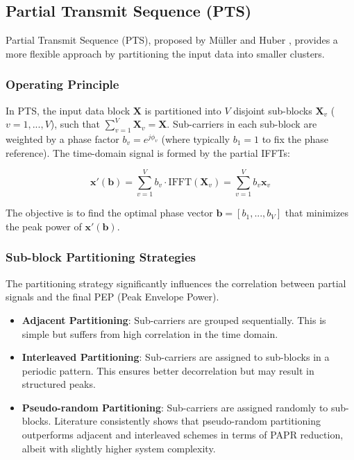 \documentclass[conference]{IEEEtran}
\begin{document}
\subsection{Partial Transmit Sequence (PTS)}
Partial Transmit Sequence (PTS), proposed by Müller and Huber \cite{ref6}, provides a more flexible approach by partitioning the input data into smaller clusters.

\subsubsection{Operating Principle}
In PTS, the input data block $\mathbf{X}$ is partitioned into $V$ disjoint sub-blocks $\mathbf{X}_v$ ($v=1, ..., V$), such that $\sum_{v=1}^{V} \mathbf{X}_v = \mathbf{X}$. Sub-carriers in each sub-block are weighted by a phase factor $b_v = e^{j\phi_v}$ (where typically $b_1=1$ to fix the phase reference). The time-domain signal is formed by the partial IFFTs:

\begin{equation}
    \mathbf{x}'(\mathbf{b}) = \sum_{v=1}^{V} b_v \cdot \text{IFFT}(\mathbf{X}_v) = \sum_{v=1}^{V} b_v \mathbf{x}_v
\end{equation}

The objective is to find the optimal phase vector $\mathbf{b} = [b_1, ..., b_V]$ that minimizes the peak power of $\mathbf{x}'(\mathbf{b})$.

\subsubsection{Sub-block Partitioning Strategies}
The partitioning strategy significantly influences the correlation between partial signals and the final PEP (Peak Envelope Power).

\begin{itemize}
    \item \textbf{Adjacent Partitioning}: Sub-carriers are grouped sequentially. This is simple but suffers from high correlation in the time domain.
    \item \textbf{Interleaved Partitioning}: Sub-carriers are assigned to sub-blocks in a periodic pattern. This ensures better decorrelation but may result in structured peaks.
    \item \textbf{Pseudo-random Partitioning}: Sub-carriers are assigned randomly to sub-blocks. Literature consistently shows that pseudo-random partitioning outperforms adjacent and interleaved schemes in terms of PAPR reduction, albeit with slightly higher system complexity.
\end{itemize}
\end{document}

